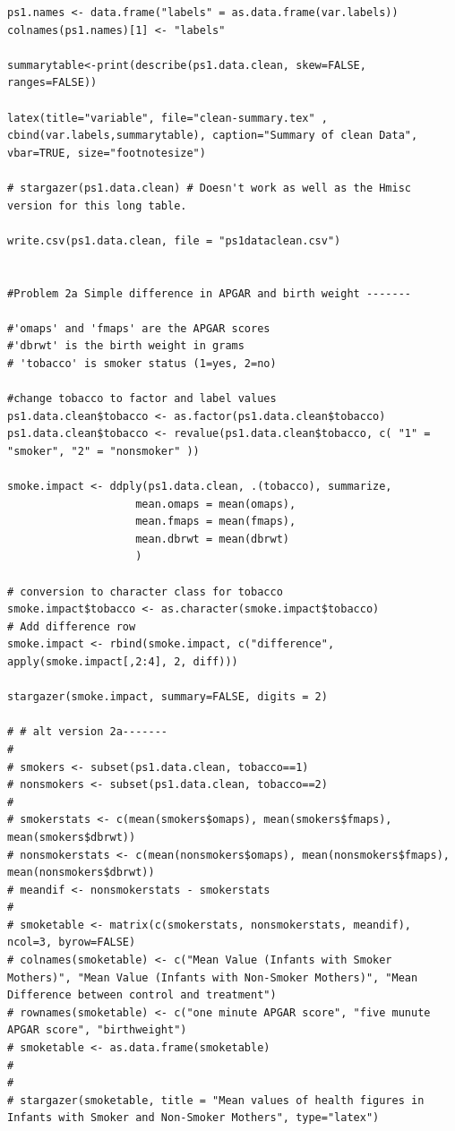 \documentclass[a4paper, 12pt]{article}
\begin{document}
\begin{verbatim}
ps1.names <- data.frame("labels" = as.data.frame(var.labels))
colnames(ps1.names)[1] <- "labels" 

summarytable<-print(describe(ps1.data.clean, skew=FALSE, ranges=FALSE))

latex(title="variable", file="clean-summary.tex" , cbind(var.labels,summarytable), caption="Summary of clean Data", vbar=TRUE, size="footnotesize")

# stargazer(ps1.data.clean) # Doesn't work as well as the Hmisc version for this long table.

write.csv(ps1.data.clean, file = "ps1dataclean.csv")


#Problem 2a Simple difference in APGAR and birth weight -------

#'omaps' and 'fmaps' are the APGAR scores
#'dbrwt' is the birth weight in grams
# 'tobacco' is smoker status (1=yes, 2=no)

#change tobacco to factor and label values
ps1.data.clean$tobacco <- as.factor(ps1.data.clean$tobacco)
ps1.data.clean$tobacco <- revalue(ps1.data.clean$tobacco, c( "1" = "smoker", "2" = "nonsmoker" ))

smoke.impact <- ddply(ps1.data.clean, .(tobacco), summarize, 
                    mean.omaps = mean(omaps),
                    mean.fmaps = mean(fmaps),
                    mean.dbrwt = mean(dbrwt)
                    )

# conversion to character class for tobacco
smoke.impact$tobacco <- as.character(smoke.impact$tobacco)
# Add difference row
smoke.impact <- rbind(smoke.impact, c("difference", apply(smoke.impact[,2:4], 2, diff)))

stargazer(smoke.impact, summary=FALSE, digits = 2)

# # alt version 2a-------
# 
# smokers <- subset(ps1.data.clean, tobacco==1)
# nonsmokers <- subset(ps1.data.clean, tobacco==2)
# 
# smokerstats <- c(mean(smokers$omaps), mean(smokers$fmaps), mean(smokers$dbrwt))
# nonsmokerstats <- c(mean(nonsmokers$omaps), mean(nonsmokers$fmaps), mean(nonsmokers$dbrwt))
# meandif <- nonsmokerstats - smokerstats
# 
# smoketable <- matrix(c(smokerstats, nonsmokerstats, meandif), ncol=3, byrow=FALSE)
# colnames(smoketable) <- c("Mean Value (Infants with Smoker Mothers)", "Mean Value (Infants with Non-Smoker Mothers)", "Mean Difference between control and treatment")
# rownames(smoketable) <- c("one minute APGAR score", "five munute APGAR score", "birthweight")
# smoketable <- as.data.frame(smoketable)
# 
# 
# stargazer(smoketable, title = "Mean values of health figures in Infants with Smoker and Non-Smoker Mothers", type="latex")


\end{verbatim}
\end{document}
